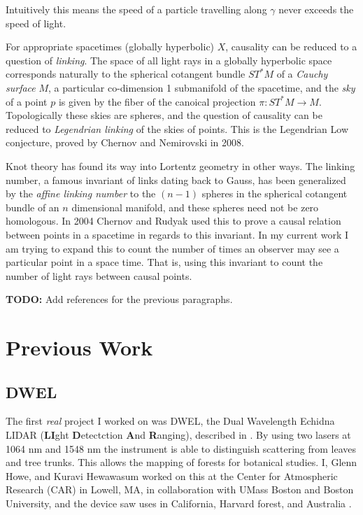 \documentclass{article}
\theoremstyle{plain}
\begin{document}
        Intuitively this means the speed of a particle travelling along $\gamma$
        never exceeds the speed of light.
        \par\hfill\par
        For appropriate spacetimes (globally hyperbolic) $X$, causality can be
        reduced to a question of \textit{linking}. The space of all light rays
        in a globally hyperbolic space corresponds naturally to the
        spherical cotangent bundle $ST^{*}M$ of a \textit{Cauchy surface} $M$,
        a particular co-dimension 1 submanifold of the spacetime, and the
        \textit{sky} of a point $p$ is given by the fiber of the canoical
        projection $\pi:ST^{*}M\rightarrow{M}$. Topologically these skies are
        spheres, and the question of causality can be reduced to
        \textit{Legendrian linking} of the skies of points. This is the
        Legendrian Low conjecture, proved by Chernov and Nemirovski in 2008.
        \par\hfill\par
        Knot theory has found its way into Lortentz geometry in other ways.
        The linking number, a famous invariant of links dating back to Gauss,
        has been generalized by the \textit{affine linking number} to the
        $(n-1)$ spheres in the spherical cotangent bundle of an $n$ dimensional
        manifold, and these spheres need not be zero homologous.
        In 2004 Chernov and Rudyak used this to prove a causal
        relation between points in a spacetime in regards to this invariant.
        In my current work I am trying to expand this to count the number of
        times an observer may see a particular point in a space time. That is,
        using this invariant to count the number of light rays between
        causal points.
        \par\hfill\par
        \textbf{TODO:} Add references for the previous paragraphs.
    \section{Previous Work}
        \subsection{DWEL}
            The first \textit{real} project I worked on was DWEL, the
            Dual Wavelength Echidna LIDAR
            (\textbf{LI}ght \textbf{D}etectction \textbf{A}nd \textbf{R}anging),
            described in \cite{DWEL2012}.
            By using two lasers at 1064 nm and 1548 nm the instrument is able
            to distinguish scattering from leaves and tree trunks. This allows
            the mapping of forests for botanical studies. I, Glenn Howe, and
            Kuravi Hewawasum worked on this at the Center for Atmospheric
            Research (CAR) in Lowell, MA, in collaboration with UMass Boston
            and Boston University, and the device saw uses in California,
            Harvard forest, and Australia
            \cite{Li2016RadiometricCO}.
\end{document}
